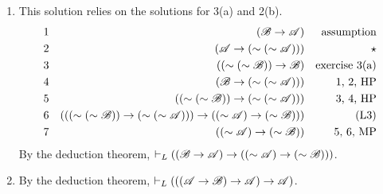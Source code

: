\begin{enumerate}
\begin{enumerate}[label=(\alph*)]
      \item This solution relies on the solutions for 3(a) and 2(b).
        \begin{align*}
          \text{1}&&
          (\mathscr{B} \rightarrow \mathscr{A})&&
          \text{assumption}\\
          \text{2}&&
          (\mathscr{A} \rightarrow (\sim(\sim\mathscr{A})))&&
          \star\\
          \text{3}&&
          ((\sim(\sim\mathscr{B})) \rightarrow \mathscr{B})&&
          \text{exercise 3(a)}\\
          \text{4}&&
          (\mathscr{B} \rightarrow (\sim(\sim\mathscr{A})))&&
          \text{1, 2, HP}\\
          \text{5}&&
          ((\sim(\sim\mathscr{B})) \rightarrow (\sim(\sim\mathscr{A})))&&
          \text{3, 4, HP}\\
          \text{6}&&
          (((\sim(\sim\mathscr{B})) \rightarrow (\sim(\sim\mathscr{A}))) \rightarrow ((\sim\mathscr{A}) \rightarrow (\sim\mathscr{B})))&&
          \text{(L3)}\\
          \text{7}&&
          ((\sim\mathscr{A}) \rightarrow (\sim\mathscr{B}))&&
          \text{5, 6, MP}
        \end{align*}
        By the deduction theorem, \(\vdash_{L} ((\mathscr{B} \rightarrow \mathscr{A}) \rightarrow ((\sim\mathscr{A}) \rightarrow (\sim\mathscr{B})))\).

      \item

        By the deduction theorem, \(\vdash_{L} (((\mathscr{A} \rightarrow \mathscr{B}) \rightarrow \mathscr{A}) \rightarrow \mathscr{A})\).
        

\end{enumerate}
\end{enumerate}
